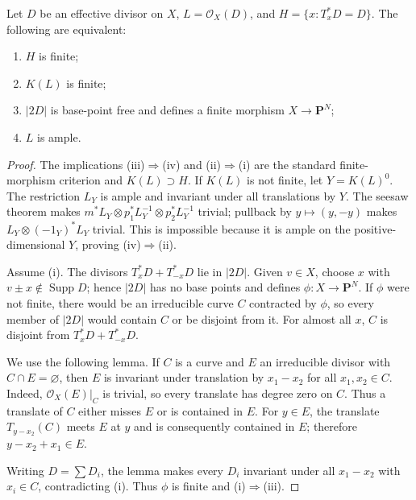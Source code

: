 \begin{proposition}
\label{mumford-prop-effective-divisor-criterion}
Let $D$ be an effective divisor on $X$, $L=\mathcal O_X(D)$, and
$H=\{x:T_x^*D=D\}$.  The following are equivalent:
\begin{enumerate}
\item $H$ is finite;
\item $K(L)$ is finite;
\item $|2D|$ is base-point free and defines a finite morphism
      $X\to\mathbf P^N$;
\item $L$ is ample.
\end{enumerate}
\end{proposition}
\begin{proof}
The implications (iii)$\Rightarrow$(iv) and (ii)$\Rightarrow$(i) are the
standard finite-morphism criterion and $K(L)\supset H$.  If $K(L)$ is not
finite, let $Y=K(L)^0$.  The restriction $L_Y$ is ample and invariant under
all translations by $Y$.  The seesaw theorem makes
$m^*L_Y\otimes p_1^*L_Y^{-1}\otimes p_2^*L_Y^{-1}$ trivial; pullback by
$y\mapsto(y,-y)$ makes $L_Y\otimes(-1_Y)^*L_Y$ trivial.  This is impossible
because it is ample on the positive-dimensional $Y$, proving (iv)$\Rightarrow$(ii).

Assume (i).  The divisors $T_x^*D+T_{-x}^*D$ lie in $|2D|$.  Given $v\in X$,
choose $x$ with $v\pm x\notin\operatorname{Supp}D$; hence $|2D|$ has no
base points and defines $\phi:X\to\mathbf P^N$.  If $\phi$ were not finite,
there would be an irreducible curve $C$ contracted by $\phi$, so every member
of $|2D|$ would contain $C$ or be disjoint from it.  For almost all $x$,
$C$ is disjoint from $T_x^*D+T_{-x}^*D$.

We use the following lemma.  If $C$ is a curve and $E$ an irreducible divisor
with $C\cap E=\varnothing$, then $E$ is invariant under translation by
$x_1-x_2$ for all $x_1,x_2\in C$.  Indeed, $\mathcal O_X(E)|_C$ is trivial,
so every translate has degree zero on $C$.  Thus a translate of $C$ either
misses $E$ or is contained in $E$.  For $y\in E$, the translate
$T_{y-x_2}(C)$ meets $E$ at $y$ and is consequently contained in $E$;
therefore $y-x_2+x_1\in E$.

Writing $D=\sum D_i$, the lemma makes every $D_i$ invariant under all
$x_1-x_2$ with $x_i\in C$, contradicting (i).  Thus $\phi$ is finite and
(i)$\Rightarrow$(iii).
\end{proof}

